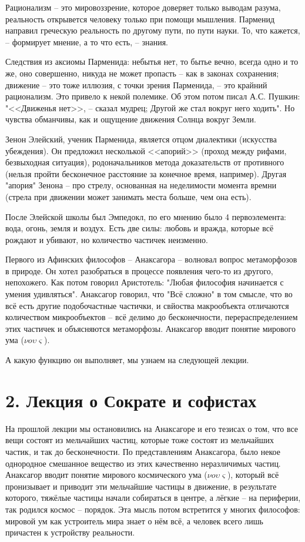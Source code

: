 \documentclass[a4paper, 12pt]{article} %
\begin{document}
Рационализм -- это мировоззрение, которое доверяет только выводам разума, реальность открывется человеку только при помощи мышления. Парменид направил греческую реальность по другому пути, по пути науки. То, что кажется, -- формирует мнение, а то что есть, -- знания.

Следствия из аксиомы Парменида: небытья нет, то бытье вечно, всегда одно и то же, оно совершенно, никуда не может пропасть -- как в законах сохранения; движение -- это тоже иллюзия, с точки зрения Парменида, -- это крайний рационализм. Это привело к некой полемике. Об этом потом писал А.С. Пушкин: "<<Движенья нет>>, -- сказал мудрец; Другой же стал вокруг него ходить". Но чувства обманчивы, как и ощущение движения Солнца вокруг Земли.

Зенон Элейский, ученик Парменида, является отцом диалектики (искусства убеждения). Он предложил несколькой <<апорий>> (проход между рифами, безвыходная ситуация), родоначальников метода доказательств от противного (нельзя пройти бесконечное расстояние за конечное время, например). Другая "апория" Зенона -- про стрелу, основанная на неделимости момента времни (стрела при движении может занимать места больше, чем она есть).

После Элейской школы был Эмпедокл, по его мнению было 4 первоэлемента: вода, огонь, земля и воздух. Есть две силы: любовь и вражда, которые всё рождают и убивают, но количество частичек неизменно.

Первого из Афинских философов -- Анаксагора -- волновал вопрос метаморфозов в природе. Он хотел разобраться в процессе появления чего-то из другого, непохожего. Как потом говорил Аристотель: "Любая философия начинается с умения удивляться". Анаксагор говорил, что "Всё сложно" в том смысле, что во всё есть другие подобочастные частички, и свйоства макрообъекта отличаются количеством микрообъектов -- всё делимо до бесконечности, перераспределением этих частичек и объясняются метаморфозы. Анаксагор вводит понятие мирового ума ($\nu o \upsilon \varsigma $).

 А какую функцию он выполняет, мы узнаем на следующей лекции.

\newpage

\section*{2. Лекция о Сократе и софистах}

На прошлой лекции мы остановились на Анаксагоре и его тезисах о том, что все вещи состоят из мельчайших частиц, которые тоже состоят из мельчайших частик, и так до бесконечности. По представлениям Анаксагора, было некое однородное смешанное вещество из этих качественно неразличимых частиц. Анаксагор вводит понятие мирового космического ума ($\nu o \upsilon \varsigma $), который всё пронизывает и приводит эти мельчайшие частицы в движение, в результате которого, тяжёлые частицы начали собираться в центре, а лёгкие  -- на периферии, так родился космос -- порядок. Эта мысль потом встретится у многих философов: мировой ум как устроитель мира знает о нём всё, а человек всего лишь причастен к устройству реальности.
\end{document}
